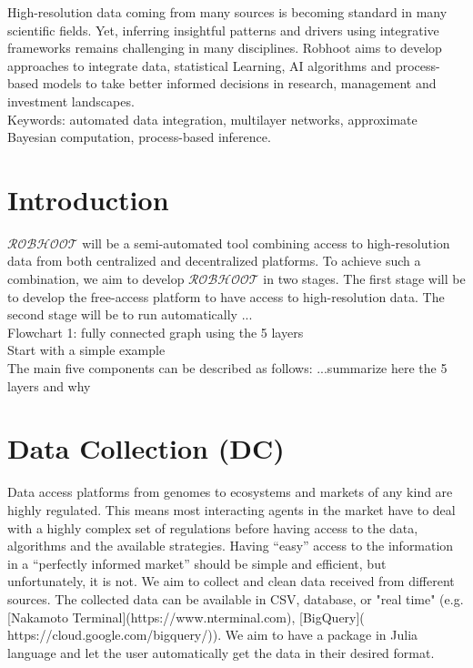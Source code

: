 \documentclass[english,12pt]{article}
\begin{document}
High-resolution data coming from many sources is becoming standard in many
scientific fields. Yet, inferring insightful patterns and drivers
using integrative frameworks remains challenging in many
disciplines. Robhoot aims to develop approaches to integrate data,
statistical Learning, AI algorithms and process-based models to take
better informed decisions in research, management and investment
landscapes.
\\
Keywords: automated data integration, multilayer networks, approximate Bayesian computation, process-based inference.
\newpage


\section{Introduction}

$\mathcal{ROBHOOT}$ will be a semi-automated tool combining
access to high-resolution data from both centralized and decentralized platforms. To achieve such a combination, we aim to
develop $\mathcal{ROBHOOT}$ in two stages. The first stage will be to
develop the free-access platform to have access to high-resolution
data. The second stage will
be to run automatically ...
\\
Flowchart 1: fully connected graph using the 5 layers\\ 
Start with a simple example\\

The main five components can be described as follows: 
...summarize here the 5 layers and why
\\

\section{Data Collection (DC)}

Data access platforms from genomes to ecosystems and markets of
any kind are highly regulated. This means most interacting agents in
the market have to deal with a highly complex set of regulations
before having access to the data, algorithms and the available
strategies. Having ``easy'' access to the information in a ``perfectly
informed market'' should be simple and efficient, but unfortunately,
it is not. We aim to collect and clean data received from different sources. The
collected data can be available in CSV, database, or "real time"
(e.g. [Nakamoto Terminal](https://www.nterminal.com), [BigQuery](
https://cloud.google.com/bigquery/)). We aim to have a package in
Julia language and let the user automatically get the data in their
desired format.
\end{document}
